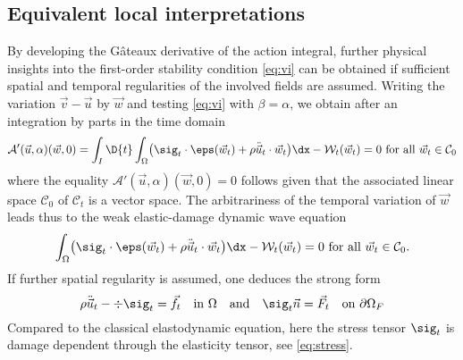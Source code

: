 \subsection{Equivalent local interpretations} \label{sec:equivalentlocal}
By developing the Gâteaux derivative of the action integral, further physical insights into the first-order stability condition \eqref{eq:vi} can be obtained if sufficient spatial and temporal regularities of the involved fields are assumed. Writing the variation $\vec{v}-\vec{u}$ by $\vec{w}$ and testing \eqref{eq:vi} with $\beta=\alpha$, we obtain after an integration by parts in the time domain
\begin{equation} \label{eq:actionu}
\mathcal{A}'(\vec{u},\alpha)(\vec{w},0)=\int_I\D{t}\int_\Omega\bigl(\sig_t\cdot\eps(\vec{w}_t)+\rho\ddot{\vec{u}}_t\cdot\vec{w}_t\bigr)\dx-\mathcal{W}_t(\vec{w}_t)=0\text{ for all $\vec{w}_t\in\mathcal{C}_0$}
\end{equation}
where the equality $\mathcal{A}'(\vec{u},\alpha)(\vec{w},0)=0$ follows given that the associated linear space $\mathcal{C}_0$ of $\mathcal{C}_t$ is a vector space. The arbitrariness of the temporal variation of $\vec{w}$ leads thus to the weak elastic-damage dynamic wave equation
\begin{equation} \label{eq:weakform}
\int_\Omega\bigl(\sig_t\cdot\eps(\vec{w}_t)+\rho\ddot{\vec{u}}_t\cdot\vec{w}_t\bigr)\dx-\mathcal{W}_t(\vec{w}_t)=0\text{ for all $\vec{w}_t\in\mathcal{C}_0$}.
\end{equation}
If further spatial regularity is assumed, one deduces the strong form
\begin{equation} \label{eq:wavedyn}
\rho\ddot{\vec{u}}_t-\div\sig_t=\vec{f}_t\quad\text{in }\Omega\quad\text{and}\quad\sig_t\vec{n}=\vec{F}_t\quad\text{on }\partial\Omega_F
\end{equation}
Compared to the classical elastodynamic equation, here the stress tensor $\sig_t$ is damage dependent through the elasticity tensor, see \eqref{eq:stress}.


